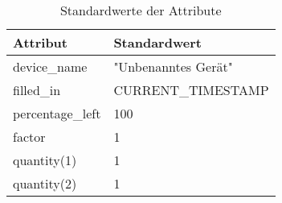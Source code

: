 \begin{table}
    \centering
    \begin{tabular}{l|l}
        Attribut & Standardwert \\
        \hline
        device\_name          & "Unbenanntes Gerät" \\
        filled\_in            & CURRENT\_TIMESTAMP  \\
        percentage\_left      & 100                 \\
        factor                & 1                   \\
        quantity(1)           & 1                   \\
        quantity(2)           & 1                   \\
    \end{tabular}
    \caption{Standardwerte der Attribute}
    \label{tab:2.3}
\end{table}
